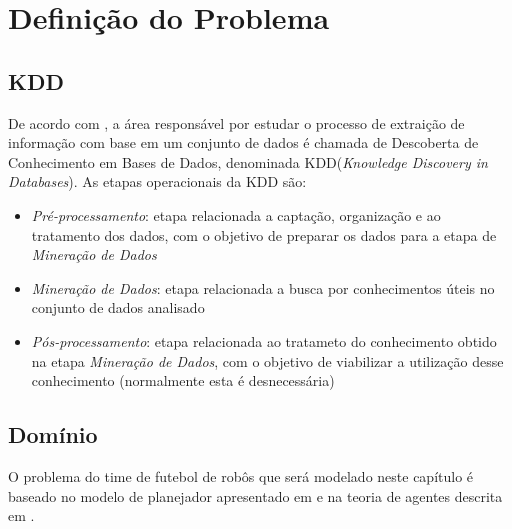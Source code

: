 \chapter{Definição do Problema}\label{cap:def_problema}

\section{KDD}

De acordo com \cite{passos2005datamining}, a área responsável por estudar o processo de extraição de informação com base em um conjunto de dados é
chamada de Descoberta de Conhecimento em Bases de Dados, denominada
KDD(\textit{Knowledge Discovery in Databases}). As etapas operacionais da KDD são:
\begin{itemize}
  \item \textit{Pré-processamento}: etapa relacionada a captação,
        organização e ao tratamento dos dados, com o objetivo de
        preparar os dados para a etapa de \textit{Mineração de Dados}
  \item \textit{Mineração de Dados}: etapa relacionada a busca por
        conhecimentos úteis no conjunto de dados analisado
  \item \textit{Pós-processamento}: etapa relacionada ao tratameto do
        conhecimento obtido na etapa \textit{Mineração de Dados}, com
        o objetivo de viabilizar a utilização desse conhecimento
        (normalmente esta é desnecessária)
\end{itemize}



\section{Domínio}

O problema do time de futebol de robôs que será modelado neste capítulo é baseado no modelo de planejador apresentado em \cite{zickler} e na teoria
de agentes descrita em \cite{russellnorvig}.



